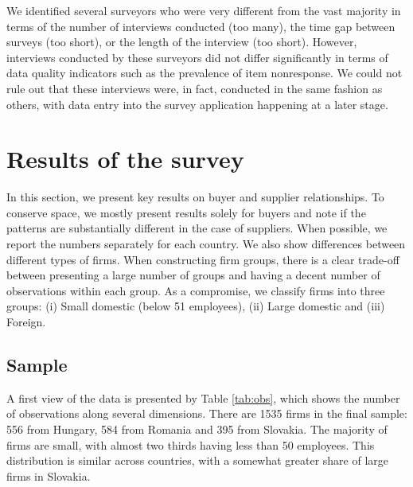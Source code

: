 \documentclass[final, dvipsnames, authoryear,12pt]{elsarticle}
\begin{document}
We identified several surveyors who were very different from the vast majority in terms of the number of interviews conducted (too many), the time gap between surveys (too short), or the length of the interview (too short). However, interviews conducted by these surveyors did not differ significantly in terms of data quality indicators such as the prevalence of item nonresponse. We could not rule out that these interviews were, in fact, conducted in the same fashion as others, with data entry into the survey application happening at a later stage.


\section{Results of the survey}
\label{sec:desc}

In this section, we present key results on buyer and supplier relationships. To conserve space, we mostly present results solely for buyers and note if the patterns are substantially different in the case of suppliers. When possible, we report the numbers separately for each country. We also show differences between different types of firms. When constructing firm groups, there is a clear trade-off between presenting a large number of groups and having a decent number of observations within each group. As a compromise, we classify firms into three groups: (i) Small domestic (below 51 employees), (ii) Large domestic and (iii) Foreign. 



\subsection{Sample}


A first view of the data is presented by Table \ref{tab:obs}, which shows the number of observations along several dimensions. There are 1535 firms in the final sample: 556 from Hungary, 584 from Romania and 395 from Slovakia. The majority of firms are small, with almost two thirds having less than 50 employees. This distribution is similar across countries, with a somewhat greater share of large firms in Slovakia.

\end{document}
